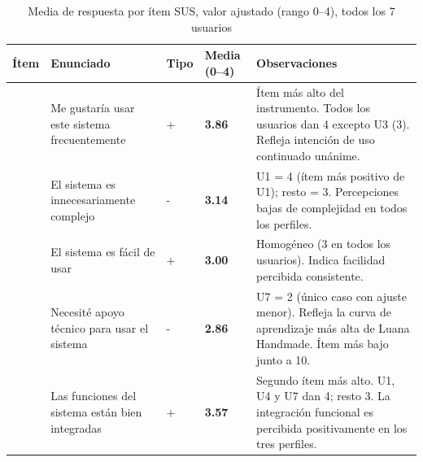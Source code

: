 \begin{longtable}[]{@{}
  >{\raggedright\arraybackslash}p{}
  >{\raggedright\arraybackslash}p{}
  >{\raggedright\arraybackslash}p{}
  >{\raggedright\arraybackslash}p{}
  >{\raggedright\arraybackslash}p{}@{}}
\caption[Media de respuesta por ítem SUS, valor ajustado (rango 0--4), todos los 7 usuarios]{Media de respuesta por ítem SUS, valor ajustado (rango 0--4), todos los 7 usuarios}\tabularnewline
\toprule\noalign{}
\begin{minipage}[b]{\linewidth}\raggedright
Ítem
\end{minipage} & \begin{minipage}[b]{\linewidth}\raggedright
Enunciado
\end{minipage} & \begin{minipage}[b]{\linewidth}\raggedright
Tipo
\end{minipage} & \begin{minipage}[b]{\linewidth}\raggedright
Media (0--4)
\end{minipage} & \begin{minipage}[b]{\linewidth}\raggedright
Observaciones
\end{minipage} \\
\midrule\noalign{}
\endhead
\bottomrule\noalign{}
\endlastfoot
1 & Me gustaría usar este sistema frecuentemente & + & \textbf{3.86} & Ítem más alto del instrumento. Todos los usuarios dan 4 excepto U3 (3). Refleja intención de uso continuado unánime. \\
2 & El sistema es innecesariamente complejo & - & \textbf{3.14} & U1 = 4 (ítem más positivo de U1); resto = 3. Percepciones bajas de complejidad en todos los perfiles. \\
3 & El sistema es fácil de usar & + & \textbf{3.00} & Homogéneo (3 en todos los usuarios). Indica facilidad percibida consistente. \\
4 & Necesité apoyo técnico para usar el sistema & - & \textbf{2.86} & U7 = 2 (único caso con ajuste menor). Refleja la curva de aprendizaje más alta de Luana Handmade. Ítem más bajo junto a 10. \\
5 & Las funciones del sistema están bien integradas & + & \textbf{3.57} & Segundo ítem más alto. U1, U4 y U7 dan 4; resto 3. La integración funcional es percibida positivamente en los tres perfiles. \\

\end{longtable}
